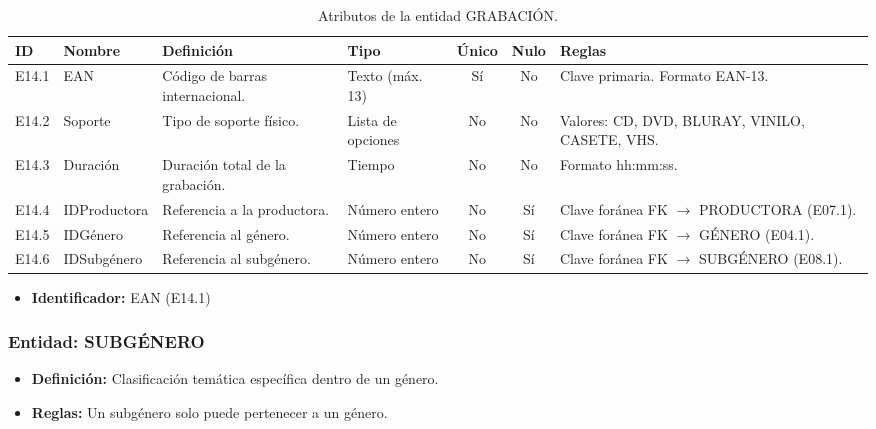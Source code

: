 	\begin{table}[H]
		\centering
		\caption{Atributos de la entidad GRABACIÓN.}
		\label{tab:dict_grabacion}
		\small
		\begin{tabularx}{\textwidth}{l l X l c c X}
			\toprule
			\textbf{ID} & \textbf{Nombre} & \textbf{Definición} & \textbf{Tipo} & \textbf{Único} & \textbf{Nulo} & \textbf{Reglas} \\
			\midrule
			E14.1 & EAN & Código de barras internacional. & Texto (máx. 13) & Sí & No & Clave primaria. Formato EAN-13. \\
			\addlinespace
			E14.2 & Soporte & Tipo de soporte físico. & Lista de opciones & No & No & Valores: CD, DVD, BLURAY, VINILO, CASETE, VHS. \\
			\addlinespace
			E14.3 & Duración & Duración total de la grabación. & Tiempo & No & No & Formato hh:mm:ss. \\
			\addlinespace
			E14.4 & IDProductora & Referencia a la productora. & Número entero & No & Sí & Clave foránea FK $\rightarrow$ PRODUCTORA (E07.1). \\
			\addlinespace
			E14.5 & IDGénero & Referencia al género. & Número entero & No & Sí & Clave foránea FK $\rightarrow$ GÉNERO (E04.1). \\
			\addlinespace
			E14.6 & IDSubgénero & Referencia al subgénero. & Número entero & No & Sí & Clave foránea FK $\rightarrow$ SUBGÉNERO (E08.1). \\
			\bottomrule
		\end{tabularx}
	\end{table}
	
	\begin{itemize}
		\item\textbf{Identificador:} EAN (E14.1)
	\end{itemize}
	
	\subsubsection{Entidad: SUBGÉNERO}
	\begin{itemize}
		\item\textbf{Definición:} Clasificación temática específica dentro de un género.
		\item\textbf{Reglas:} Un subgénero solo puede pertenecer a un género.
	\end{itemize}
	
